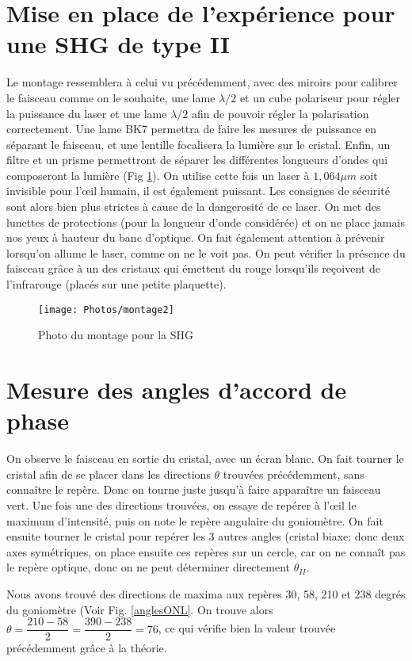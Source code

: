 \documentclass[a4paper,11pt]{report}
\begin{document}
\section{Mise en place de l'expérience pour une SHG de type II}
Le montage ressemblera à celui vu précédemment, avec des miroirs pour calibrer le faisceau comme on le souhaite, une lame $\lambda/2$ et un cube polariseur pour régler la puissance du laser et une lame $\lambda/2$ afin de pouvoir régler la polarisation correctement. Une lame BK7 permettra de faire les mesures de puissance en séparant le faisceau, et une lentille focalisera la lumière sur le cristal. Enfin, un filtre et un prisme permettront de séparer les différentes longueurs d'ondes qui composeront la lumière (Fig \ref{montageONL}). On utilise cette fois un laser à $1,064\mu m$ soit invisible pour l'œil humain, il est également puissant. Les consignes de sécurité sont alors bien plus strictes à cause de la dangerosité de ce laser. On met des lunettes de protections (pour la longueur d'onde considérée) et on ne place jamais nos yeux à hauteur du banc d'optique. On fait également attention à prévenir lorsqu'on allume le laser, comme on ne le voit pas. On peut vérifier la présence du faisceau grâce à un des cristaux qui émettent du rouge lorsqu'ils reçoivent de l'infrarouge (placés sur une petite plaquette).

\begin{figure}
\centering
    \texttt{[image: Photos/montage2]}
    \caption{Photo du montage pour la SHG}
    \label{montageONL}
\end{figure}
\section{Mesure des angles d'accord de phase}
On observe le faisceau en sortie du cristal, avec un écran blanc. On fait tourner le cristal afin de se placer dans les directions $\theta$ trouvées précédemment, sans connaître le repère. Donc on tourne juste jusqu'à faire apparaître un faisceau vert. Une fois une des directions trouvées, on essaye de repérer à l'œil le maximum d'intensité, puis on note le repère angulaire du goniomètre. On fait ensuite tourner le cristal pour repérer les 3 autres angles (cristal biaxe: donc deux axes symétriques, on place ensuite ces repères sur un cercle, car on ne connaît pas le repère optique, donc on ne peut déterminer directement $\theta_{II}$.

Nous avons trouvé des directions de maxima aux repères 30, 58, 210 et 238 degrés du goniomètre (Voir Fig. \ref{anglesONL}. On trouve alors $\theta=\dfrac{210-58}{2}=\dfrac{390-238}{2}=76$\textdegree, ce qui vérifie bien la valeur trouvée précédemment grâce à la théorie.
\end{document}
